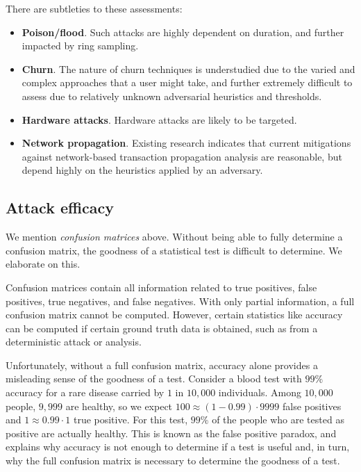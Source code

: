 \documentclass{article}
\theoremstyle{definition}
\begin{document}
There are subtleties to these assessments:
\begin{itemize}
\item \textbf{Poison/flood}. Such attacks are highly dependent on duration, and further impacted by ring sampling.
\item \textbf{Churn}. The nature of churn techniques is understudied due to the varied and complex approaches that a user might take, and further extremely difficult to assess due to relatively unknown adversarial heuristics and thresholds.
\item \textbf{Hardware attacks}. Hardware attacks are likely to be targeted.
\item \textbf{Network propagation}. Existing research indicates that current mitigations against network-based transaction propagation analysis are reasonable, but depend highly on the heuristics applied by an adversary.
\end{itemize}


\subsection{Attack efficacy}

We mention \textit{confusion matrices} above.
Without being able to fully determine a confusion matrix, the goodness of a statistical test is difficult to determine.
We elaborate on this.

Confusion matrices contain all information related to true positives, false positives, true negatives, and false negatives.
With only partial information, a full confusion matrix cannot be computed.
However, certain statistics like accuracy can be computed if certain ground truth data is obtained, such as from a deterministic attack or analysis.

Unfortunately, without a full confusion matrix, accuracy alone provides a misleading sense of the goodness of a test.
Consider a blood test with $99\%$ accuracy for a rare disease carried by $1$ in $10,000$ individuals.
Among $10,000$ people, $9,999$ are healthy, so we expect $100 \approx (1-0.99) \cdot 9999$ false positives and $1 \approx 0.99 \cdot 1$ true positive.
For this test, $99\%$ of the people who are tested as positive are actually healthy.
This is known as the false positive paradox, and explains why accuracy is not enough to determine if a test is useful and, in turn, why the full confusion matrix is necessary to determine the goodness of a test.
\end{document}
